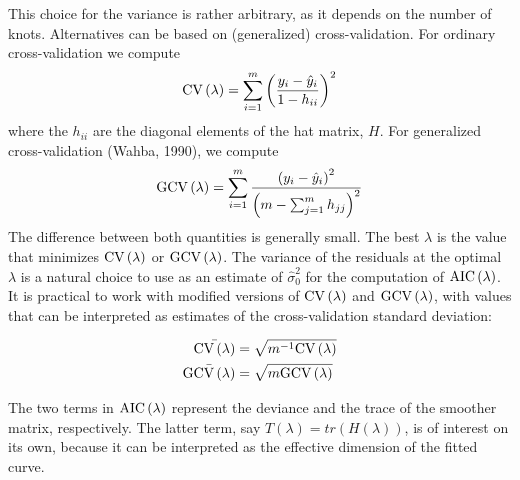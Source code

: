 \documentclass[12pt]{article}
\newcommand*\needsparaphrased{\color{red}}
\begin{document}
{{\needsparaphrased This choice for the variance is rather arbitrary, as it depends on the number of knots. Alternatives can be based on (generalized) cross-validation. For ordinary cross-validation we compute}
\begin{equation} \label{eq:univariate_CV}
\textup{CV}\left(\lambda\right) = \sum_{i=1}^m \left( \frac{ y_i - \hat{y}_i }{1-h_{ii}}\right)^2 
\end{equation}
{\needsparaphrased where the $h_{ii}$ are the diagonal elements of the hat matrix, $H$. For generalized cross-validation (Wahba, 1990), we compute }
\begin{equation} \label{eq:univariate_GCV}
\textup{GCV}\left(\lambda\right) = \sum_{i=1}^m \frac{\left(  y_i - \hat{y}_i \right)^2}{\left(m-\sum_{j=1}^m h_{jj}\right)^2} 
\end{equation}
{\needsparaphrased The difference between both quantities is generally small. The best $\lambda$ is the value that minimizes $\textup{CV}\left(\lambda\right)$ or $\textup{GCV}\left(\lambda\right) $. The variance of the residuals at the optimal $\lambda$ is a natural choice to use as an estimate of $\hat{\sigma}_0^2$ for the computation of $\textup{AIC}\left(\lambda\right)$. It is practical to work with modified versions of $\textup{CV}\left(\lambda\right)$ and $\textup{GCV}\left(\lambda\right)$, with values that can be interpreted as estimates of the cross-validation standard deviation:}

\begin{equation}
\begin{split}
\bar{\textup{CV}\left(\lambda\right)} &= \sqrt{m^{-1}\textup{CV}\left(\lambda\right)} \\
\bar{\textup{GCV}\left(\lambda\right)} &= \sqrt{m\textup{GCV}\left(\lambda\right)} \\
\end{split}
\end{equation}

{\needsparaphrased The two terms in $\textup{AIC}\left(\lambda\right)$ represent the deviance and the trace of the smoother matrix, respectively. The latter term, say $T\left(\lambda\right) = tr\left(H\left(\lambda\right)\right)$, is of interest on its own, because it can be interpreted as the effective dimension of the fitted curve.

}}
\end{document}
